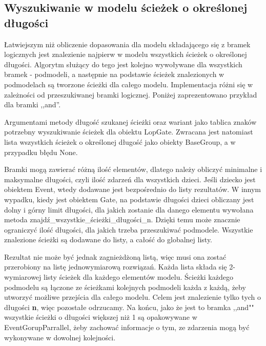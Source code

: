 \subsection{Wyszukiwanie w modelu ścieżek o określonej długości}

Łatwiejszym niż obliczenie dopasowania dla modelu składającego się z bramek logicznych jest znalezienie najpierw w modelu wszystkich ścieżek o określonej długości. Algorytm służący do tego jest kolejno wywoływane dla wszystkich bramek - podmodeli, a następnie na podstawie ścieżek znalezionych w podmodelach są tworzone ścieżki dla całego modelu. Implementacja różni się w zależności od przeszukiwanej bramki logicznej. Poniżej zaprezentowano przykład dla bramki ,,and''.  

Argumentami metody długość szukanej ścieżki oraz wariant jako tablica znaków potrzebny wyszukiwanie ścieżek dla obiektu LopGate. Zwracana jest natomiast lista wszystkich ścieżek o określonej długość jako obiekty BaseGroup, a w przypadku błędu None.

Bramki mogą zawierać różną ilość elementów, dlatego należy obliczyć minimalne i maksymalne długości, czyli ilość zdarzeń dla wszystkich dzieci. Jeśli dziecko jest obiektem Event, wtedy dodawane jest bezpośrednio do listy rezultatów. W innym wypadku, kiedy jest obiektem Gate, na podstawie długości dzieci obliczany jest dolny i górny limit długości, dla jakich zostanie dla danego elementu wywołana metoda znajdź{\_}wszystkie{\_}ścieżki{\_}długości{\_}n. Dzięki temu może znacznie ograniczyć ilość długości, dla jakich trzeba przeszukiwać podmodele. Wszystkie znalezione ścieżki są dodawane do listy, a całość do globalnej listy. 

Rezultat nie może być jednak zagnieżdżoną listą, więc musi ona zostać przerobiony na listę jednowymiarową rozwiązań. Każda lista składa się 2-wymiarowej listy ścieżek dla każdego elementów modelu. Ścieżki każdego podmodelu są łączone ze ścieżkami kolejnych podmodeli każda z każdą, żeby utworzyć możliwe przejścia dla całego modelu. Celem jest znalezienie tylko tych o długości \textbf{n}, więc pozostałe odrzucamy. Na końcu, jako że jest to bramka ,,and"" wszystkie ścieżki o długości większej niż 1 są opakowywane w EventGorupParrallel, żeby zachować informacje o tym, ze zdarzenia mogą być wykonywane w dowolnej kolejności.
\clearpage

